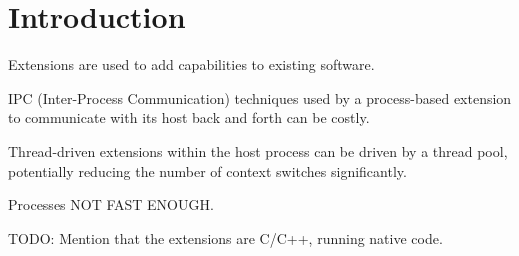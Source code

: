 \chapter {Introduction}

Extensions are used to add capabilities to existing software.

IPC (Inter-Process Communication) techniques used by a process-based extension
to communicate with its host back and forth can be costly.

Thread-driven extensions within the host process can be driven by a thread
pool, potentially reducing the number of context switches significantly.

Processes NOT FAST ENOUGH.

TODO: Mention that the extensions are C/C++, running native code.
